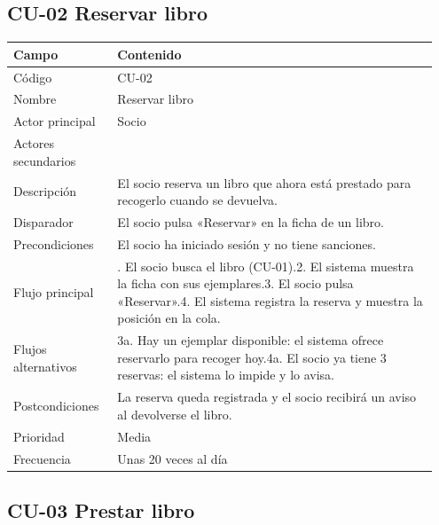 \documentclass[11pt,a4paper]{article}
\begin{document}
\subsection*{CU-02 Reservar libro}

{\small
\begin{longtable}{@{}>{\raggedright\arraybackslash}p{0.232\linewidth}>{\raggedright\arraybackslash}p{0.717\linewidth}@{}}
\toprule
\textbf{Campo} & \textbf{Contenido} \\
\midrule
\endhead
Código & CU-02 \\
Nombre & Reservar libro \\
Actor principal & Socio \\
Actores secundarios &  \\
Descripción & El socio reserva un libro que ahora está prestado para recogerlo cuando se devuelva. \\
Disparador & El socio pulsa «Reservar» en la ficha de un libro. \\
Precondiciones & El socio ha iniciado sesión y no tiene sanciones. \\
Flujo principal & 1. El socio busca el libro (CU-01).\newline{}2. El sistema muestra la ficha con sus ejemplares.\newline{}3. El socio pulsa «Reservar».\newline{}4. El sistema registra la reserva y muestra la posición en la cola. \\
Flujos alternativos & 3a. Hay un ejemplar disponible: el sistema ofrece reservarlo para recoger hoy.\newline{}4a. El socio ya tiene 3 reservas: el sistema lo impide y lo avisa. \\
Postcondiciones & La reserva queda registrada y el socio recibirá un aviso al devolverse el libro. \\
Prioridad & Media \\
Frecuencia & Unas 20 veces al día \\
\bottomrule
\end{longtable}}

\subsection*{CU-03 Prestar libro}
\end{document}
